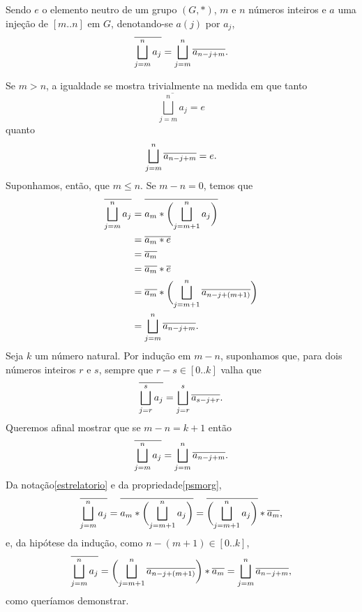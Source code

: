 \begin{Teo}
  Sendo $e$ o elemento neutro de um grupo $(G,\ast )$, $m$ e $n$ números
  inteiros e
  $a$ uma injeção de $[m..n]$ em $G$, denotando-se $a(j)$ por
  $a_j$,
  \begin{equation*}
    \overline{\bigsqcup_{j=m}^na_j} =
    \bigsqcup_{j=m}^n\overline{a_{n-j+m}}\mathrm{.}
  \end{equation*}
\end{Teo}

\begin{dem}
  Se
  $m>n$, a igualdade se mostra trivialmente na medida em que tanto
  \begin{equation*}
    \overline{\bigsqcup_{j=m}^na_j} = e
  \end{equation*}
  quanto
  \begin{equation*}
    \bigsqcup_{j=m}^n\overline{a_{n-j+m}} = e\mathrm{.}
  \end{equation*}
  Suponhamos, então, que $m\leq n$. Se $m-n=0$, temos que
  \begin{equation*}
    \begin{aligned}
      \overline{\bigsqcup_{j=m}^na_j} &=
        \overline{a_m\ast \biggl(\bigsqcup_{j=m+1}^na_j\biggr)}\\
        &= \overline{a_m\ast e} \\
        &= \overline{a_m} \\
        &= \overline{a_m}\ast \overline{e} \\ &=
        \overline{a_m}\ast \biggl(
           \bigsqcup_{j=m+1}^n\overline{a_{n-j+(m+1)}}
        \biggr)\\
        &= \bigsqcup_{j=m}^n\overline{a_{n-j+m}}\mathrm{.}
    \end{aligned}
  \end{equation*}
  Seja $k$ um número natural. Por indução em $m-n$, suponhamos que, para
  dois números
  inteiros $r$ e $s$, sempre que $r-s\in[0..k]$ valha que
  \begin{equation*}
    \overline{\bigsqcup_{j=r}^sa_j} =
    \bigsqcup_{j=r}^s\overline{a_{s-j+r}}\mathrm{.}
  \end{equation*}
  Queremos afinal mostrar que se $m-n=k+1$ então
  \begin{equation*}
    \overline{\bigsqcup_{j=m}^na_j} =
    \bigsqcup_{j=m}^n\overline{a_{n-j+m}}\mathrm{.}
  \end{equation*}
  Da notação\xspace\ref{estrelatorio} e da
  propriedade\xspace\ref{psmorg},
  \begin{equation*}
    \overline{\bigsqcup_{j=m}^na_j} =
    \overline{a_m\ast \biggl(\bigsqcup_{j=m+1}^na_j\biggr)} =
    \overline{\biggl(\bigsqcup_{j=m+1}^na_j\biggr)}\ast
    \overline{a_m}\mathrm{,}
  \end{equation*}
  e, da hipótese da indução, como $n-(m+1)\in[0..k]$,
  \begin{equation*}
    \overline{\bigsqcup_{j=m}^na_j} =
    \biggl(\bigsqcup_{j=m+1}^n\overline{a_{n-j+(m+1)}}\biggr)
      \ast \overline{a_m} =
    \bigsqcup_{j=m}^n\overline{a_{n-j+m}}\mathrm{,}
  \end{equation*}
  como queríamos demonstrar.
\end{dem}


